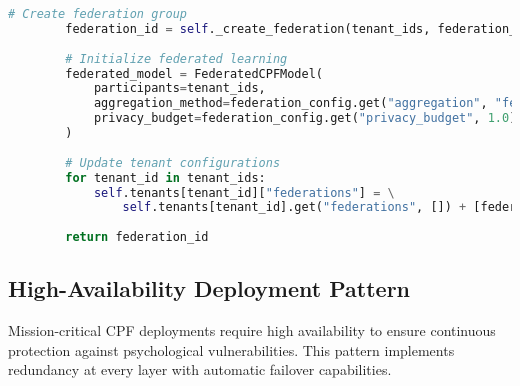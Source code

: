 \documentclass[11pt,a4paper]{article}
\begin{document}
\begin{lstlisting}[language=Python, caption=Multi-Tenant CPF Implementation]
        # Create federation group
        federation_id = self._create_federation(tenant_ids, federation_config)
        
        # Initialize federated learning
        federated_model = FederatedCPFModel(
            participants=tenant_ids,
            aggregation_method=federation_config.get("aggregation", "fedavg"),
            privacy_budget=federation_config.get("privacy_budget", 1.0)
        )
        
        # Update tenant configurations
        for tenant_id in tenant_ids:
            self.tenants[tenant_id]["federations"] = \
                self.tenants[tenant_id].get("federations", []) + [federation_id]
        
        return federation_id
\end{lstlisting}

\subsection{High-Availability Deployment Pattern}

Mission-critical CPF deployments require high availability to ensure continuous protection against psychological vulnerabilities. This pattern implements redundancy at every layer with automatic failover capabilities.
\end{document}
